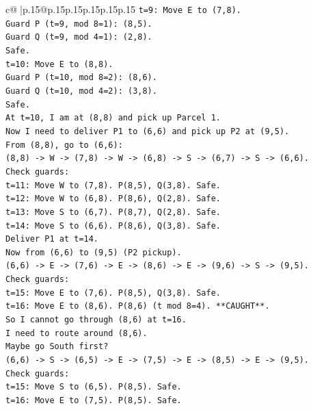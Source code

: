 \documentclass{article}
\begin{document}
{\begin{supertabular}{c@{$\;$}|p{.15\linewidth}@{}p{.15\linewidth}p{.15\linewidth}p{.15\linewidth}p{.15\linewidth}p{.15\linewidth}}
{{{\texttt{t=9: Move E to (7,8).} \\
\texttt{Guard P (t=9, mod 8=1): (8,5).} \\
\texttt{Guard Q (t=9, mod 4=1): (2,8).} \\
\texttt{Safe.} \\
\texttt{t=10: Move E to (8,8).} \\
\texttt{Guard P (t=10, mod 8=2): (8,6).} \\
\texttt{Guard Q (t=10, mod 4=2): (3,8).} \\
\texttt{Safe.} \\
\texttt{At t=10, I am at (8,8) and pick up Parcel 1.} \\
\texttt{Now I need to deliver P1 to (6,6) and pick up P2 at (9,5).} \\
\texttt{From (8,8), go to (6,6):} \\
\texttt{(8,8) {-}> W {-}> (7,8) {-}> W {-}> (6,8) {-}> S {-}> (6,7) {-}> S {-}> (6,6).} \\
\texttt{Check guards:} \\
\texttt{t=11: Move W to (7,8). P(8,5), Q(3,8). Safe.} \\
\texttt{t=12: Move W to (6,8). P(8,6), Q(2,8). Safe.} \\
\texttt{t=13: Move S to (6,7). P(8,7), Q(2,8). Safe.} \\
\texttt{t=14: Move S to (6,6). P(8,6), Q(3,8). Safe.} \\
\texttt{Deliver P1 at t=14.} \\
\texttt{Now from (6,6) to (9,5) (P2 pickup).} \\
\texttt{(6,6) {-}> E {-}> (7,6) {-}> E {-}> (8,6) {-}> E {-}> (9,6) {-}> S {-}> (9,5).} \\
\texttt{Check guards:} \\
\texttt{t=15: Move E to (7,6). P(8,5), Q(3,8). Safe.} \\
\texttt{t=16: Move E to (8,6). P(8,6) (t mod 8=4). **CAUGHT**.} \\
\texttt{So I cannot go through (8,6) at t=16.} \\
\texttt{I need to route around (8,6).} \\
\texttt{Maybe go South first?} \\
\texttt{(6,6) {-}> S {-}> (6,5) {-}> E {-}> (7,5) {-}> E {-}> (8,5) {-}> E {-}> (9,5).} \\
\texttt{Check guards:} \\
\texttt{t=15: Move S to (6,5). P(8,5). Safe.} \\
\texttt{t=16: Move E to (7,5). P(8,5). Safe.} \\
}}}
\end{supertabular}}
\end{document}

